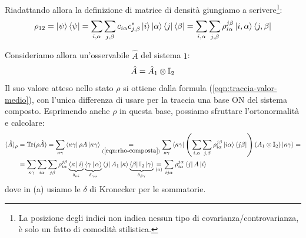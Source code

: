 \documentclass[../../InformazioneQuantistica.tex]{subfiles}
\begin{document}
Riadattando allora la definizione di matrice di densità giungiamo a scrivere\footnote{La posizione degli indici non indica nessun tipo di covarianza/controvarianza, è solo un fatto di comodità stilistica.}:
\begin{align}
\rho_{12} = \Ket{\psi}\Bra{\psi} = \sum_{i,\alpha}\sum_{j,\beta}c_{i\alpha}c^*_{j,\beta} \Ket{i}\Ket{\alpha}\Bra{j}\Bra{\beta} = \sum_{i,\alpha}\sum_{j,\beta} \rho_{i\alpha}^{j\beta} \Ket{i,\alpha}\Bra{j,\beta}
\label{eqn:rho-composta}
\end{align}

Consideriamo allora un'osservabile $\hat{A}$ del sistema $1$:
\begin{align*}
\hat{A} = \hat{A}_1 \otimes \mathbb{I}_2
\end{align*}
Il suo valore atteso nello stato $\rho$ si ottiene dalla formula (\ref{eqn:traccia-valor-medio}), con l'unica differenza di usare per la traccia una base ON del sistema composto. Esprimendo anche $\rho$ in questa base, possiamo sfruttare l'ortonormalità e calcolare:
\begin{align*}
\langle \hat{A}\rangle_\rho &=
\operatorname{Tr}(\rho \hat{A}) = \sum_{\kappa\gamma}\Bra{\kappa\gamma} \rho A 
\Ket{\kappa\gamma} \underset{(\ref{eqn:rho-composta})}{=} \sum_{\kappa\gamma} \Bra{\kappa\gamma} \left(\sum_{i,\alpha}\sum_{j,\beta}\rho_{i\alpha}^{j\beta}\Ket{i\alpha}\Bra{j\beta}\right)
\left(A_1 \otimes \mathbb{I}_2\right)  \Ket{\kappa\gamma} =\\
&= \sum_{\kappa \gamma} \sum_{i\alpha}\sum_{j\beta} \rho_{i\alpha}^{j\beta} \underbrace{\Braket{\kappa|i}}_{\delta_{\kappa i}}\underbrace{\Braket{\gamma|\alpha}}_{\delta_{\gamma \alpha}}\Bra{j}A_1\Ket{\kappa}\underbrace{\Bra{\beta}\mathbb{I}_2\Ket{\gamma}}_{\delta_{\beta \gamma}} \underset{(a)}{=}\sum_{ij \alpha} \rho_{i\alpha}^{j\alpha}\Bra{j}A\Ket{i} 
\end{align*}
dove in (a) usiamo le $\delta$ di Kronecker per  le sommatorie.\\
\end{document}
